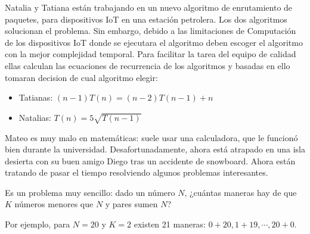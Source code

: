 \documentclass[12pt, a4paper]{exam}
\begin{document}
\begin{questions}
    \pointsdroppedatright
    \question
    Natalia y Tatiana están trabajando en un nuevo algoritmo de enrutamiento de paquetes,
    para dispositivos IoT en una estación petrolera. Los dos algoritmos solucionan el 
    problema. Sin embargo, debido a las limitaciones de Computación de los dispositivos IoT
    donde se ejecutara el algoritmo deben escoger el algoritmo con la mejor complejidad
    temporal. Para facilitar la tarea del equipo de calidad ellas calculan las ecuaciones
    de recurrencia de los algoritmos y basadas en ello tomaran decision de cual algoritmo 
    elegir:
    \begin{itemize}
        \item Tatianas: $ (n-1)T(n) = (n-2)T(n-1) + n$
        \item Natalias: $ T(n) = 5\sqrt{T(n-1)}$
    \end{itemize}
    
    \question
    Mateo es muy malo en matemáticas: suele usar una calculadora, que le funcionó bien
    durante la universidad. Desafortunadamente, ahora está atrapado en una isla desierta
    con su buen amigo Diego tras un accidente de snowboard. Ahora están tratando de pasar
    el tiempo resolviendo algunos problemas interesantes.

    Es un problema muy sencillo: dado un número $N$, ¿cuántas maneras hay de que $K$
    números menores que $N$ y pares sumen $N$?

    Por ejemplo, para $N=20$ y $K=2$ existen 21 maneras: $0+20,1+19,\cdots,20+0$.

\end{questions}
\end{document}
